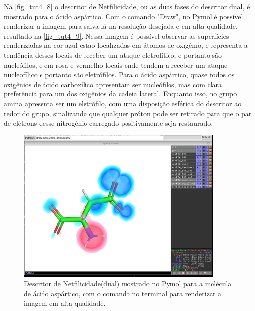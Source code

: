 \documentclass[a4paper,11pt]{refart}
\begin{document}
Na \autoref{fig_tut4_8} o descritor de Netfilicidade, ou as duas fases do descritor dual, é mostrado para o ácido aspártico. Com o comando "Draw", no Pymol é possível renderizar a imagem para salva-lá na resolução desejada e em alta qualidade, resultado na \autoref{fig_tut4_9}. Nessa imagem é possível observar as superfícies renderizadas na cor azul estão localizadas em átomos de oxigênio, e representa a tendência desses locais de receber um ataque eletrolítico, e portanto são nucleófilos, e em rosa e vermelho locais onde tendem a receber um ataque nucleofílico e portanto são eletrófilos. Para o ácido aspártico, quase todos os oxigênios de ácido carboxílico apresentam ser nucleófilos, mas com clara preferência para um dos oxigênios da cadeia lateral. Enquanto isso, no grupo amina apresenta ser um eletrófilo, com uma disposição esférica do descritor ao redor do grupo, sinalizando que qualquer próton pode ser retirado para que o par de elétrons desse nitrogênio carregado positivamente seja restaurado.

\hspace*{-\leftmarginwidth}
\begin{minipage}{\fullwidth}
	\begin{figure}[H]
		\begin{center}
			\includegraphics[width=4in]{images/tut4_img10}
			\caption{Descritor de Netfilicidade(dual) mostrado no Pymol para a molécula de ácido aspártico, com o comando no terminal para renderizar a imagem em alta qualidade.}
			\label{fig_tut4_8}
		\end{center}
	\end{figure}
\end{minipage}
\end{document}
